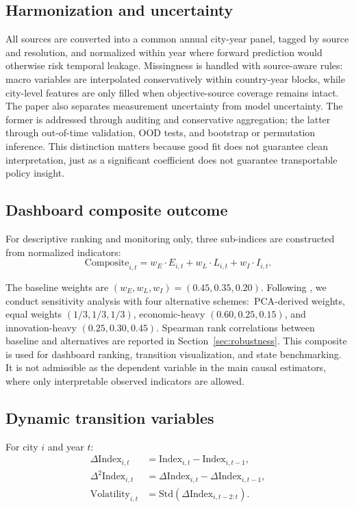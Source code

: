 \documentclass[11pt,a4paper]{article}
\newcommand{\Composite}{\text{Composite}}
\newcommand{\Index}{\text{Index}}
\newcommand{\Volatility}{\text{Volatility}}
\begin{document}
\subsection{Harmonization and uncertainty}
All sources are converted into a common annual city-year panel, tagged by source and resolution, and normalized within year where forward prediction would otherwise risk temporal leakage.
Missingness is handled with source-aware rules: macro variables are interpolated conservatively within country-year blocks, while city-level features are only filled when objective-source coverage remains intact.
The paper also separates measurement uncertainty from model uncertainty.
The former is addressed through auditing and conservative aggregation; the latter through out-of-time validation, OOD tests, and bootstrap or permutation inference.
This distinction matters because good fit does not guarantee clean interpretation, just as a significant coefficient does not guarantee transportable policy insight.

\subsection{Dashboard composite outcome}
For descriptive ranking and monitoring only, three sub-indices are constructed from normalized indicators:
\begin{equation}
  \Composite_{i,t} = w_E \cdot E_{i,t} + w_L \cdot L_{i,t} + w_I \cdot I_{i,t}.
\end{equation}

The baseline weights are $(w_E, w_L, w_I) = (0.45, 0.35, 0.20)$.
Following \citet{oecd2008handbook}, we conduct sensitivity analysis with four alternative schemes:\ PCA-derived weights, equal weights $(1/3, 1/3, 1/3)$, economic-heavy $(0.60, 0.25, 0.15)$, and innovation-heavy $(0.25, 0.30, 0.45)$.
Spearman rank correlations between baseline and alternatives are reported in Section~\ref{sec:robustness}.
This composite is used for dashboard ranking, transition visualization, and state benchmarking.
It is not admissible as the dependent variable in the main causal estimators, where only interpretable observed indicators are allowed.

\subsection{Dynamic transition variables}
For city $i$ and year $t$:
\begin{align}
  \Delta \Index_{i,t} &= \Index_{i,t} - \Index_{i,t-1}, \\
  \Delta^2 \Index_{i,t} &= \Delta \Index_{i,t} - \Delta \Index_{i,t-1}, \\
  \Volatility_{i,t} &= \mathrm{Std}(\Delta \Index_{i,t-2:t}).
\end{align}
\end{document}
